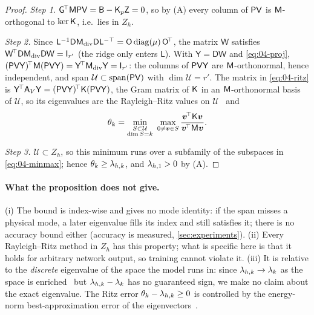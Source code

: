 \begin{proof}
\emph{Step 1.} $\Gmat^{\!\top}\Mmat\Pmat\Vmat=\mathsf B-\Kp\mathsf Z=0$, so by (A) every column of $\mathsf{P}\mathsf{V}$ is $\mathsf{M}$-orthogonal to $\ker\mathsf{K}$, i.e.\ lies in $Z_h$.

\emph{Step 2.} Since $\mathsf L^{-1}\mathsf D\Mdiv\mathsf D\mathsf L^{-\top}=\mathsf O\,\mathrm{diag}(\mu)\,\mathsf O^{\!\top}$, the matrix $\mathsf W$ satisfies $\mathsf W^{\!\top}\mathsf D\Mdiv\mathsf D\mathsf W=\mathsf I_{r'}$ (the ridge only enters $\mathsf L$).
With $\mathsf Y=\mathsf D\mathsf W$ and \eqref{eq:04-proj}, $(\Pmat\Vmat\mathsf Y)^{\!\top}\Mmat(\Pmat\Vmat\mathsf Y)=\mathsf Y^{\!\top}\Mdiv\mathsf Y=\mathsf I_{r'}$: the columns of $\mathsf{P}\mathsf{V}\mathsf Y$ are $\mathsf{M}$-orthonormal, hence independent, and span $\mathcal U\subset\operatorname{span}(\mathsf{P}\mathsf{V})$ with $\dim \mathcal U=r'$.
The matrix in \eqref{eq:04-ritz} is $\mathsf Y^{\!\top}\Av\mathsf Y=(\Pmat\Vmat\mathsf Y)^{\!\top}\Kmat(\Pmat\Vmat\mathsf Y)$, the Gram matrix of $\mathsf{K}$ in an $\mathsf{M}$-orthonormal basis of $\mathcal U$, so its eigenvalues are the Rayleigh--Ritz values on $\mathcal U$~\cite{parlett1998symmetric} and
\[
  \theta_k=\min_{\substack{S\subset \mathcal U\\ \dim S=k}}\ \max_{0\ne\bm v\in S}\frac{\bm v^{\!\top}\mathsf{K}\bm v}{\bm v^{\!\top}\mathsf{M}\bm v}.
\]

\emph{Step 3.} $\mathcal U\subset Z_h$, so this minimum runs over a subfamily of the subspaces in \eqref{eq:04-minmax}; hence $\theta_k\ge\lamh_k$, and $\lamh_1>0$ by (A).
\end{proof}

\paragraph{What the proposition does not give.}
(i) The bound is index-wise and gives no mode identity: if the span misses a physical mode, a later eigenvalue fills its index and still satisfies it; there is no accuracy bound either (accuracy is measured, \cref{sec:experiments}).
(ii) Every Rayleigh--Ritz method in $Z_h$ has this property; what is specific here is that it holds for arbitrary network output, so training cannot violate it.
(iii) It is relative to the \emph{discrete} eigenvalue of the space the model runs in: since $\lamh_k\to\lambda_k$ as the space is enriched~\cite{boffi2010finite} but $\lamh_k-\lambda_k$ has no guaranteed sign, we make no claim about the exact eigenvalue.
The Ritz error $\theta_k-\lamh_k\ge0$ is controlled by the energy-norm best-approximation error of the eigenvectors~\cite{boffi2010finite}.

